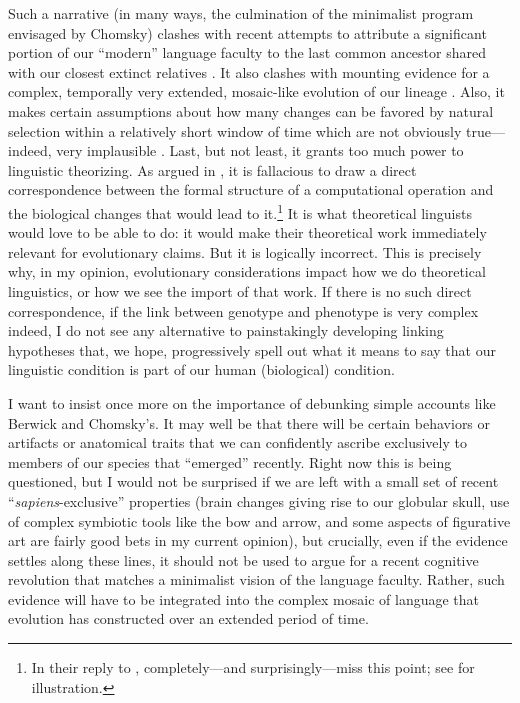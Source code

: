 Such a narrative (in many ways, the culmination of the minimalist program envisaged by Chomsky) clashes with recent attempts to attribute a significant portion of our ``modern'' language faculty to the last common ancestor shared with our closest extinct relatives \citep{dediu2013antiquity,dediu2018neanderthal}. It also clashes with mounting evidence for a complex, temporally very extended, mosaic-like evolution of our lineage \citep{scerri2018did,Bergstrom}. Also, it makes certain assumptions about how many changes can be favored by natural selection within a relatively short window of time which are not obviously true---indeed, very implausible \citep{de2020evolutionary}. Last, but not least, it grants too much power to linguistic theorizing. As argued in \cite{martins2019language}, it is fallacious to draw a direct correspondence between the formal structure of a computational operation and the biological changes that would lead to it.\footnote{In their reply to \cite{martins2019language}, \cite{berwick2019all} completely---and surprisingly---miss this point; see \cite{martinsboeckx_clar} for illustration.} It is what theoretical linguists would love to be able to do: it would make their theoretical work immediately relevant for evolutionary claims. But it is logically incorrect. This is precisely why, in my opinion, evolutionary considerations impact how we do theoretical linguistics, or how we see the import of that work. If there is no such direct correspondence, if the link between genotype and phenotype is very complex indeed, I do not see any alternative to painstakingly developing linking hypotheses that, we hope, progressively spell out what it means to say that our linguistic condition is part of our human (biological) condition.

I want to insist once more on the importance of debunking simple accounts like Berwick and Chomsky's. It may well be that there will be certain behaviors or artifacts or anatomical traits that we can confidently ascribe exclusively to members of our species that ``emerged'' recently. Right now this is being questioned, but I would not be surprised if we are left with a small set of recent ``\textit{sapiens}-exclusive'' properties (brain changes giving rise to our globular skull, use of complex symbiotic tools like the bow and arrow, and some aspects of figurative art are fairly good bets in my current opinion), but crucially, even if the evidence settles along these lines, it should not be used to argue for a recent cognitive revolution that matches a minimalist vision of the language faculty. Rather, such evidence will have to be integrated into the complex mosaic of language that evolution has constructed over an extended period of time.

